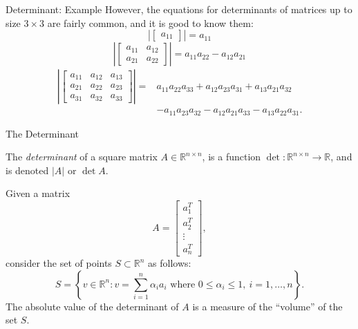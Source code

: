 \documentclass[aspectratio=169,12pt]{beamer}
\begin{document}
\begin{frame}[t]{Determinant: Example}
  \vspace{0.16cm}
  {\scriptsize
  However, the equations for determinants of matrices up to size $3\times 3$ are
  fairly common, and it is good to know them:
  \[
    \left|\begin{bmatrix}a_{11}\end{bmatrix}\right|=a_{11}
  \]
  \[
    \left|\begin{bmatrix}a_{11}&a_{12}\\a_{21}&a_{22}\end{bmatrix}\right|
    =a_{11}a_{22}-a_{12}a_{21}
  \]
  \[
  \begin{aligned}
    \left|\begin{bmatrix}
      a_{11}&a_{12}&a_{13}\\
      a_{21}&a_{22}&a_{23}\\
      a_{31}&a_{32}&a_{33}
    \end{bmatrix}\right|
    ={}&a_{11}a_{22}a_{33}+a_{12}a_{23}a_{31}+a_{13}a_{21}a_{32}\\
      &-a_{11}a_{23}a_{32}-a_{12}a_{21}a_{33}-a_{13}a_{22}a_{31}.
  \end{aligned}
  \]
  }
\end{frame}

\begin{frame}[t]{The Determinant}
  \vspace{-0.06cm}
  {\scriptsize
  The \emph{determinant} of a square matrix $A\in\mathbb{R}^{n\times n}$, is a
  function $\det:\mathbb{R}^{n\times n}\to\mathbb{R}$, and is denoted $|A|$ or
  $\det A$.

  \vspace{0.15cm}
  Given a matrix
  \[
    A=\begin{bmatrix}a_1^T\\a_2^T\\\vdots\\a_n^T\end{bmatrix},
  \]
  consider the set of points $S\subset\mathbb{R}^{n}$ as follows:
  \[
    S=\left\{v\in\mathbb{R}^{n}:v=\sum_{i=1}^{n}\alpha_i a_i
      \text{ where }0\le\alpha_i\le1,\ i=1,\ldots,n\right\}.
  \]
  The absolute value of the determinant of $A$ is a measure of the ``volume'' of
  the set $S$.
  }
\end{frame}
\end{document}
